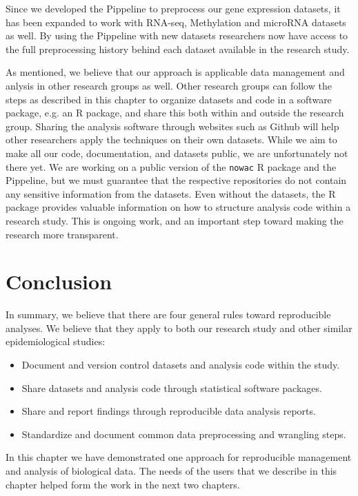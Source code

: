 Since we developed the Pippeline to preprocess our gene expression datasets, it
has been expanded to work with RNA-seq, Methylation and microRNA datasets as
well. By using the Pippeline with new datasets researchers now have access to
the full preprocessing history behind each dataset available in the research
study. 

As mentioned, we believe that our approach is applicable data management and
anlysis in other research groups as well. Other research groups can follow the
steps as described in this chapter to organize datasets and code in a software
package, e.g. an R package, and share this both within and outside the research
group. Sharing the analysis software through websites such as Github will help
other researchers apply the techniques on their own datasets. While we aim to
make all our code, documentation, and datasets public, we are unfortunately not
there yet. We are working on a public version of the \texttt{nowac} R package
and the Pippeline, but we must guarantee that the respective repositories do not
contain any sensitive information from the datasets. Even without the datasets,
the R package provides valuable information on how to structure analysis code
within a research study.  This is ongoing work, and an important step toward
making the research more transparent. 


\section{Conclusion}
In summary, we believe that there are four general rules toward reproducible
analyses. We believe that they apply to both our research study and other
similar epidemiological 
studies:
\begin{itemize} 
    \item Document and version control datasets and analysis code within the
        study. 
    \item Share datasets and analysis code through statistical software
        packages. 
    \item Share and report findings through reproducible data analysis reports. 
    \item Standardize and document common data preprocessing and wrangling
        steps.
\end{itemize} 

In this chapter we have demonstrated one approach for reproducible management
and analysis of biological data. The needs of the users that we describe in this
chapter helped form the work in the next two chapters. 

